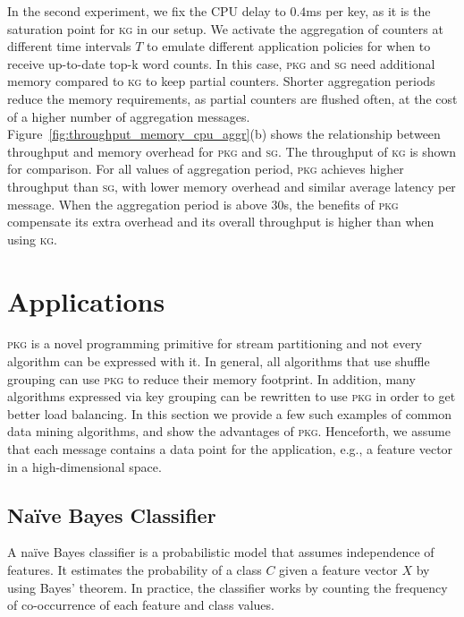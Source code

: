 \documentclass[10pt,conference,letterpaper]{IEEEtran}
\newcommand{\pkgs}{\textsc{pkg}\xspace}
\newcommand{\kg}{\textsc{kg}\xspace}
\newcommand{\sg}{\textsc{sg}\xspace}
\begin{document}
In the second experiment, we fix the CPU delay to $0.4$ms per key, as it is the saturation point for \kg in our setup.
We activate the aggregation of counters at different time intervals $T$ to emulate different application policies for when to receive up-to-date top-k word counts.
In this case, \pkgs and \sg need additional memory compared to \kg to keep partial counters.
Shorter aggregation periods reduce the memory requirements, as partial counters are flushed often, at the cost of a higher number of aggregation messages.
Figure~\ref{fig:throughput_memory_cpu_aggr}(b) shows the relationship between throughput and memory overhead for \pkgs and \sg.
The throughput of \kg is shown for comparison.
For all values of aggregation period, \pkgs achieves higher throughput than \sg, with lower memory overhead and similar average latency per message. When the aggregation period is above $30$s, the benefits of \pkgs compensate its extra overhead and its overall throughput is higher than when using \kg.

 \section{Applications}
\label{sec:applications}

\pkgs is a novel programming primitive for stream partitioning and not every algorithm can be expressed with it.
In general, all algorithms that use shuffle grouping can use \pkgs to reduce their memory footprint.
In addition, many algorithms expressed via key grouping can be rewritten to use \pkgs in order to get better load balancing.
In this section we provide a few such examples of common data mining algorithms, and show the advantages of \pkgs. Henceforth, we assume that each message contains a data point for the application, e.g., a feature vector in a high-dimensional space.

















\subsection{Na\"{i}ve Bayes Classifier}
A na\"{i}ve Bayes classifier is a probabilistic model that assumes independence of features.
It estimates the probability of a class $C$ given a feature vector $X$ by using Bayes' theorem.
In practice, the classifier works by counting the frequency of co-occurrence of each feature and class values.
\end{document}
